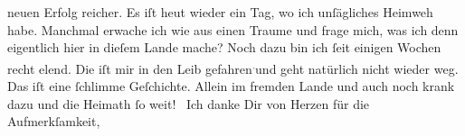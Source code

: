 \begin{ledgroupsized}[t]{13cm}
               neuen Erfolg reicher.\pend
           \pstart
           {\pb}Es iſt heut wieder
               ein Tag, wo ich unſägliches Heimweh habe. Manchmal erwache ich wie aus einen Traume
               und frage\strikeout{,} mich, was ich denn eigentlich hier in
               dieſem Lande mache? Noch dazu
               bin ich ſeit einigen Wochen recht elend. Die \label{K_L02858-3v}\label{K_L02858-3h} iſt mir in den
               Leib gefahren\substVorne{}\textsuperscript{\textcolor{gray}{,}}\substDazwischen{}und\substHinten{} geht natürlich nicht wieder weg. Das iſt eine ſchlimme Geſchichte. Allein im
               fremden Lande und auch noch
               krank dazu und die Heimath ſo weit! {\dotsfive}\pend
           \pstart
           {\pb}Ich danke Dir von Herzen für die Aufmerkſamkeit,

\end{ledgroupsized}
